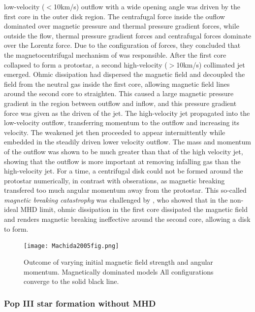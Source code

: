 \documentclass[11pt]{article}
\begin{document}
low-velocity ($<$10km/s) outflow with a wide opening angle was driven by the first core in the outer disk region. The centrafugal force inside the ouflow dominated over magnetic pressure and thermal pressure gradient forces, while outside the flow, thermal pressure gradient forces and centrafugal forces dominate over the Lorentz force. Due to the configuration of forces, they concluded that the magnetocentrifugal mechanism of \cite{Blandford1982} was responsible. After the first core collapsed to form a protostar, a second high-velocity ($>$10km/s) collimated jet emerged. Ohmic dissipation had dispersed the magnetic field and decoupled the field from the neutral gas inside the first core, allowing magnetic field lines around the second core to straighten. This caused a large magnetic pressure gradient in the region between outflow and inflow, and this pressure gradient force was given as the driven of the jet. The high-velocity jet propagated into the low-velocity outflow, transferring momentum to the outflow and increasing its velocity. The weakened jet then proceeded to appear intermittently while embedded in the steadily driven lower velocity outflow. The mass and momentum of the outflow was shown to be much greater than that of the high velocity jet, showing that the outflow is more important at removing infalling gas than the high-velocity jet. For a time, a centrifugal disk could not be formed around the protostar numerically, in contrast with obserations, as magnetic breaking transfered too much angular momentum away from the protostar. This so-called \emph{magnetic breaking catastrophy} was challenged by \cite{Basu2010}, who showed that in the non-ideal MHD limit, ohmic dissipation in the first core dissipated the magnetic field and renders magnetic breaking ineffective around the second core, allowing a disk to form. 



\begin{figure}[h!]
         \centering
		\texttt{[image: Machida2005fig.png]}
		\caption{Outcome of varying initial magnetic field strength and angular momentum. Magnetically dominated models All configurations converge to the solid black line. \citep{Machida2005}}
		\label{fig:Machida2005}
\end{figure}

\subsubsection{Pop III star formation without MHD}
\label{sub:popIII}
\end{document}
